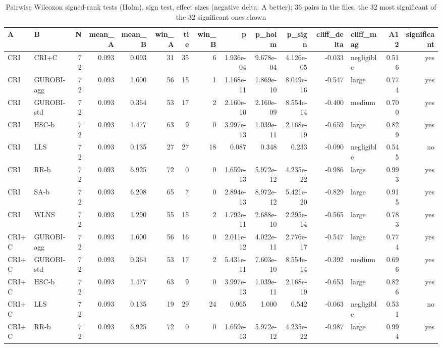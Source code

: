 \begin{table}[htbp]
\centering
\small
\caption{Pairwise Wilcoxon signed-rank tests (Holm), sign test, effect sizes (negative delta: A better); 36 pairs in the files, the 32 most significant of the 32 significant ones shown}
\label{tab:E4b_equal_budgets_60s_b60_pairwise}
\begin{tabular}{llrrrrrrrrrrlrr}
\toprule
A & B & N & mean\_A & mean\_B & win\_A & tie & win\_B & p & p\_holm & p\_sign & cliff\_delta & cliff\_mag & A12 & significant \\
\midrule
CRI & CRI+C & 72 & 0.093 & 0.093 & 31 & 35 & 6 & 1.936e-04 & 9.678e-04 & 4.126e-05 & -0.033 & negligible & 0.516 & yes \\
CRI & GUROBI-agg & 72 & 0.093 & 1.600 & 56 & 15 & 1 & 1.168e-11 & 1.869e-10 & 8.049e-16 & -0.547 & large & 0.774 & yes \\
CRI & GUROBI-std & 72 & 0.093 & 0.364 & 53 & 17 & 2 & 2.160e-10 & 2.160e-09 & 8.554e-14 & -0.400 & medium & 0.700 & yes \\
CRI & HSC-b & 72 & 0.093 & 1.477 & 63 & 9 & 0 & 3.997e-13 & 1.039e-11 & 2.168e-19 & -0.659 & large & 0.829 & yes \\
CRI & LLS & 72 & 0.093 & 0.135 & 27 & 27 & 18 & 0.087 & 0.348 & 0.233 & -0.090 & negligible & 0.545 & no \\
CRI & RR-b & 72 & 0.093 & 6.925 & 72 & 0 & 0 & 1.659e-13 & 5.972e-12 & 4.235e-22 & -0.986 & large & 0.993 & yes \\
CRI & SA-b & 72 & 0.093 & 6.208 & 65 & 7 & 0 & 2.894e-13 & 8.972e-12 & 5.421e-20 & -0.829 & large & 0.915 & yes \\
CRI & WLNS & 72 & 0.093 & 1.290 & 55 & 15 & 2 & 1.792e-11 & 2.688e-10 & 2.295e-14 & -0.565 & large & 0.783 & yes \\
CRI+C & GUROBI-agg & 72 & 0.093 & 1.600 & 56 & 16 & 0 & 2.011e-12 & 4.022e-11 & 2.776e-17 & -0.547 & large & 0.774 & yes \\
CRI+C & GUROBI-std & 72 & 0.093 & 0.364 & 53 & 17 & 2 & 5.431e-11 & 7.603e-10 & 8.554e-14 & -0.392 & medium & 0.696 & yes \\
CRI+C & HSC-b & 72 & 0.093 & 1.477 & 63 & 9 & 0 & 3.997e-13 & 1.039e-11 & 2.168e-19 & -0.653 & large & 0.826 & yes \\
CRI+C & LLS & 72 & 0.093 & 0.135 & 19 & 29 & 24 & 0.965 & 1.000 & 0.542 & -0.063 & negligible & 0.531 & no \\
CRI+C & RR-b & 72 & 0.093 & 6.925 & 72 & 0 & 0 & 1.659e-13 & 5.972e-12 & 4.235e-22 & -0.987 & large & 0.994 & yes \\

\end{tabular}
\end{table}
